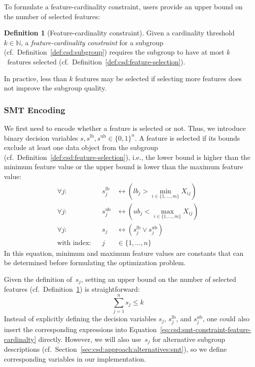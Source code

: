 \documentclass{article}
\theoremstyle{definition}
\newtheorem{definition}{Definition}
\begin{document}
To formulate a feature-cardinality constraint, users provide an upper bound on the number of selected features:
%
\begin{definition}[Feature-cardinality constraint]
	Given a cardinality threshold $k \in \mathbb{N}$,
	a \emph{feature-cardinality constraint} for a subgroup (cf.~Definition~\ref{def:csd:subgroup}) requires the subgroup to have at most $k$~features selected (cf.~Definition~\ref{def:csd:feature-selection}).
	\label{def:csd:feature-cardinality-constraint}
\end{definition}
%
In practice, less than $k$ features may be selected if selecting more features does not improve the subgroup quality.

\subsubsection{SMT Encoding}
\label{sec:csd:approach:cardinality:smt}

We first need to encode whether a feature is selected or not.
Thus, we introduce binary decision variables $s, s^{\text{lb}}, s^{\text{ub}} \in \{0, 1\}^n$.
A feature is selected if its bounds exclude at least one data object from the subgroup (cf.~Definition~\ref{def:csd:feature-selection}), i.e., the lower bound is higher than the minimum feature value or the upper bound is lower than the maximum feature value:
%
\begin{equation}
	\begin{aligned}
		\forall j: & & s^{\text{lb}}_j &\leftrightarrow \left( \mathit{lb}_j > \min_{i \in \{1, \dots, m\}} X_{ij} \right) \\
		\forall j: & &s^{\text{ub}}_j &\leftrightarrow \left( \mathit{ub}_j < \max_{i \in \{1, \dots, m\}} X_{ij} \right) \\
		\forall j: & & s_j &\leftrightarrow \left( s^{\text{lb}}_j \lor s^{\text{ub}}_j \right) \\
		\text{with index:} & & j &\in \{1, \dots, n\}
	\end{aligned}
	\label{eq:csd:smt-constraint-feature-selection}
\end{equation}
%
In this equation, minimum and maximum feature values are constants that can be determined before formulating the optimization problem.

Given the definition of~$s_j$, setting an upper bound on the number of selected features (cf.~Definition~\ref{def:csd:feature-cardinality-constraint}) is straightforward:
%
\begin{equation}
	\sum_{j=1}^n s_j \leq k
	\label{eq:csd:smt-constraint-feature-cardinalty}
\end{equation}
%
Instead of explicitly defining the decision variables $s_j$, $s^{\text{lb}}_j$, and $s^{\text{ub}}_j$, one could also insert the corresponding expressions into Equation~\ref{eq:csd:smt-constraint-feature-cardinalty} directly.
However, we will also use~$s_j$ for alternative subgroup descriptions (cf.~Section~\ref{sec:csd:approach:alternatives:smt}), so we define corresponding variables in our implementation.
\end{document}
